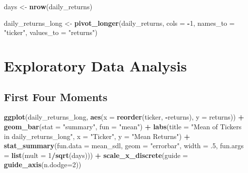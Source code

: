 \documentclass[
]{article}
\newenvironment{Shaded}{\begin{snugshade}}{\end{snugshade}}
\newcommand{\AttributeTok}[1]{\textcolor[rgb]{0.13,0.29,0.53}{#1}}
\newcommand{\DecValTok}[1]{\textcolor[rgb]{0.00,0.00,0.81}{#1}}
\newcommand{\FunctionTok}[1]{\textcolor[rgb]{0.13,0.29,0.53}{\textbf{#1}}}
\newcommand{\NormalTok}[1]{#1}
\newcommand{\OtherTok}[1]{\textcolor[rgb]{0.56,0.35,0.01}{#1}}
\newcommand{\SpecialCharTok}[1]{\textcolor[rgb]{0.81,0.36,0.00}{\textbf{#1}}}
\newcommand{\StringTok}[1]{\textcolor[rgb]{0.31,0.60,0.02}{#1}}
\begin{document}
\begin{Shaded}
\begin{Highlighting}[]
\NormalTok{days }\OtherTok{\textless{}{-}} \FunctionTok{nrow}\NormalTok{(daily\_returns)}

\NormalTok{daily\_returns\_long }\OtherTok{\textless{}{-}} \FunctionTok{pivot\_longer}\NormalTok{(daily\_returns, }\AttributeTok{cols =} \SpecialCharTok{{-}}\DecValTok{1}\NormalTok{, }\AttributeTok{names\_to =} \StringTok{"ticker"}\NormalTok{, }\AttributeTok{values\_to =} \StringTok{"returns"}\NormalTok{)}
\end{Highlighting}
\end{Shaded}

\hypertarget{exploratory-data-analysis}{%
\section{Exploratory Data Analysis}\label{exploratory-data-analysis}}

\hypertarget{first-four-moments}{%
\subsection{First Four Moments}\label{first-four-moments}}

\begin{Shaded}
\begin{Highlighting}[]
\FunctionTok{ggplot}\NormalTok{(daily\_returns\_long, }\FunctionTok{aes}\NormalTok{(}\AttributeTok{x =} \FunctionTok{reorder}\NormalTok{(ticker, }\SpecialCharTok{{-}}\NormalTok{returns), }\AttributeTok{y =}\NormalTok{ returns)) }\SpecialCharTok{+}
  \FunctionTok{geom\_bar}\NormalTok{(}\AttributeTok{stat =} \StringTok{"summary"}\NormalTok{, }\AttributeTok{fun =} \StringTok{"mean"}\NormalTok{) }\SpecialCharTok{+}
  \FunctionTok{labs}\NormalTok{(}\AttributeTok{title =} \StringTok{"Mean of Tickers in daily\_returns\_long"}\NormalTok{, }\AttributeTok{x =} \StringTok{"Ticker"}\NormalTok{, }\AttributeTok{y =} \StringTok{"Mean Returns"}\NormalTok{) }\SpecialCharTok{+} 
  \FunctionTok{stat\_summary}\NormalTok{(}\AttributeTok{fun.data =}\NormalTok{ mean\_sdl, }\AttributeTok{geom =} \StringTok{"errorbar"}\NormalTok{, }\AttributeTok{width =}\NormalTok{ .}\DecValTok{5}\NormalTok{, }\AttributeTok{fun.args =} \FunctionTok{list}\NormalTok{(}\AttributeTok{mult =} \DecValTok{1}\SpecialCharTok{/}\FunctionTok{sqrt}\NormalTok{(days))) }\SpecialCharTok{+}
  \FunctionTok{scale\_x\_discrete}\NormalTok{(}\AttributeTok{guide =} \FunctionTok{guide\_axis}\NormalTok{(}\AttributeTok{n.dodge=}\DecValTok{2}\NormalTok{))}
\end{Highlighting}
\end{Shaded}
\end{document}
